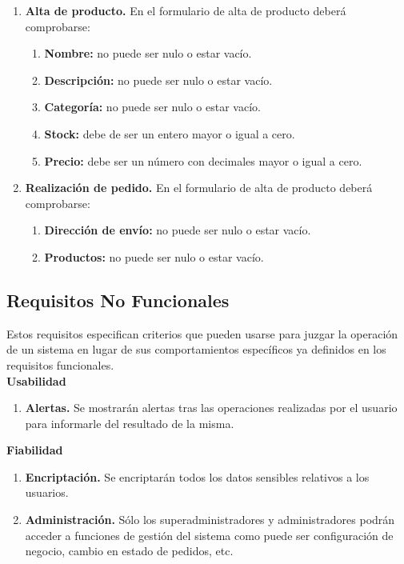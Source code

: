 \begin{enumerate}[leftmargin=1.75cm,start=1,label={\bfseries RS-\arabic*.}]
    \item \textbf{Alta de producto.} En el formulario de alta de producto deberá comprobarse:
    \begin{enumerate}[start=1,label={\bfseries RS-6.\arabic*.}]
        \item \textbf{Nombre:} no puede ser nulo o estar vacío.
        \item \textbf{Descripción:} no puede ser nulo o estar vacío.
        \item \textbf{Categoría:} no puede ser nulo o estar vacío.
        \item \textbf{Stock:} debe de ser un entero mayor o igual a cero.
        \item \textbf{Precio:} debe ser un número con decimales mayor o igual a cero.
    \end{enumerate}
    
    \item \textbf{Realización de pedido.} En el formulario de alta de producto deberá comprobarse:
    \begin{enumerate}[start=1,label={\bfseries RS-7.\arabic*.}]
        \item \textbf{Dirección de envío:} no puede ser nulo o estar vacío.
        \item \textbf{Productos:} no puede ser nulo o estar vacío.
    \end{enumerate}
\end{enumerate}

\subsection{Requisitos No Funcionales}

Estos requisitos especifican criterios que pueden usarse para juzgar la operación de un sistema en lugar de sus comportamientos específicos ya definidos en los requisitos funcionales.\\

\textbf{Usabilidad}

\begin{enumerate}[leftmargin=2.4cm,start=1,label={\bfseries RNF-\arabic*.}]
\setlength\itemsep{1em}
    \item \textbf{Alertas.} Se mostrarán alertas tras las operaciones realizadas por el usuario para informarle del resultado de la misma.
\end{enumerate}


\textbf{Fiabilidad}

\begin{enumerate}[leftmargin=2.4cm,start=3,label={\bfseries RNF-\arabic*.}]
    \item \textbf{Encriptación.} Se encriptarán todos los datos sensibles relativos a los usuarios.
    \item \textbf{Administración.} Sólo los superadministradores y administradores podrán acceder a funciones de gestión del sistema como puede ser configuración de negocio, cambio en estado de pedidos, etc.
\end{enumerate}


